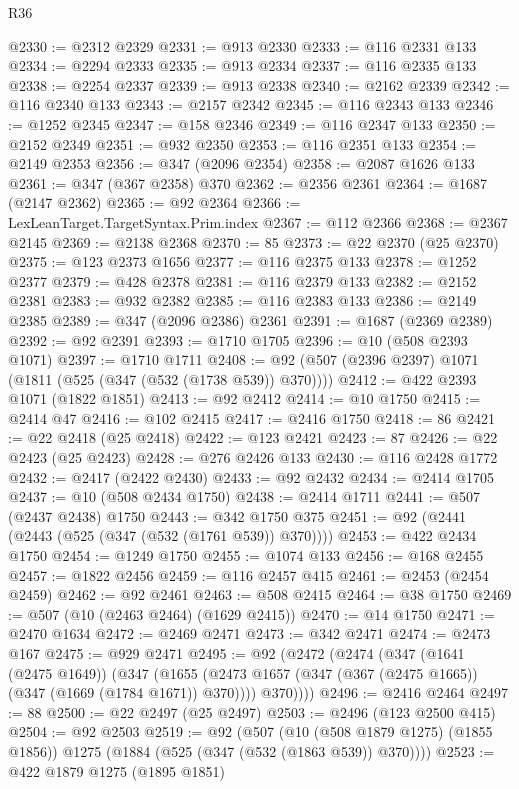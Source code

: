 \begin{lexlean}{R36}
\begin{coremodule}
@2330 := @2312 @2329
@2331 := @913 @2330
@2333 := @116 @2331 @133
@2334 := @2294 @2333
@2335 := @913 @2334
@2337 := @116 @2335 @133
@2338 := @2254 @2337
@2339 := @913 @2338
@2340 := @2162 @2339
@2342 := @116 @2340 @133
@2343 := @2157 @2342
@2345 := @116 @2343 @133
@2346 := @1252 @2345
@2347 := @158 @2346
@2349 := @116 @2347 @133
@2350 := @2152 @2349
@2351 := @932 @2350
@2353 := @116 @2351 @133
@2354 := @2149 @2353
@2356 := @347 (@2096 @2354)
@2358 := @2087 @1626 @133
@2361 := @347 (@367 @2358) @370
@2362 := @2356 @2361
@2364 := @1687 (@2147 @2362)
@2365 := @92 @2364
@2366 := LexLeanTarget.TargetSyntax.Prim.index
@2367 := @112 @2366
@2368 := @2367 @2145
@2369 := @2138 @2368
@2370 := 85
@2373 := @22 @2370 (@25 @2370)
@2375 := @123 @2373 @1656
@2377 := @116 @2375 @133
@2378 := @1252 @2377
@2379 := @428 @2378
@2381 := @116 @2379 @133
@2382 := @2152 @2381
@2383 := @932 @2382
@2385 := @116 @2383 @133
@2386 := @2149 @2385
@2389 := @347 (@2096 @2386) @2361
@2391 := @1687 (@2369 @2389)
@2392 := @92 @2391
@2393 := @1710 @1705
@2396 := @10 (@508 @2393 @1071)
@2397 := @1710 @1711
@2408 := @92 (@507 (@2396 @2397) @1071 (@1811 (@525 (@347 (@532 (@1738 @539)) @370))))
@2412 := @422 @2393 @1071 (@1822 @1851)
@2413 := @92 @2412
@2414 := @10 @1750
@2415 := @2414 @47
@2416 := @102 @2415
@2417 := @2416 @1750
@2418 := 86
@2421 := @22 @2418 (@25 @2418)
@2422 := @123 @2421
@2423 := 87
@2426 := @22 @2423 (@25 @2423)
@2428 := @276 @2426 @133
@2430 := @116 @2428 @1772
@2432 := @2417 (@2422 @2430)
@2433 := @92 @2432
@2434 := @2414 @1705
@2437 := @10 (@508 @2434 @1750)
@2438 := @2414 @1711
@2441 := @507 (@2437 @2438) @1750
@2443 := @342 @1750 @375
@2451 := @92 (@2441 (@2443 (@525 (@347 (@532 (@1761 @539)) @370))))
@2453 := @422 @2434 @1750
@2454 := @1249 @1750
@2455 := @1074 @133
@2456 := @168 @2455
@2457 := @1822 @2456
@2459 := @116 @2457 @415
@2461 := @2453 (@2454 @2459)
@2462 := @92 @2461
@2463 := @508 @2415
@2464 := @38 @1750
@2469 := @507 (@10 (@2463 @2464) (@1629 @2415))
@2470 := @14 @1750
@2471 := @2470 @1634
@2472 := @2469 @2471
@2473 := @342 @2471
@2474 := @2473 @167
@2475 := @929 @2471
@2495 := @92
    (@2472
      (@2474
        (@347
          (@1641 (@2475 @1649))
          (@347
            (@1655 (@2473 @1657 (@347 (@367 (@2475 @1665)) (@347 (@1669 (@1784 @1671)) @370))))
            @370))))
@2496 := @2416 @2464
@2497 := 88
@2500 := @22 @2497 (@25 @2497)
@2503 := @2496 (@123 @2500 @415)
@2504 := @92 @2503
@2519 := @92
    (@507
      (@10 (@508 @1879 @1275) (@1855 @1856))
      @1275
      (@1884 (@525 (@347 (@532 (@1863 @539)) @370))))
@2523 := @422 @1879 @1275 (@1895 @1851)

\end{coremodule}
\end{lexlean}
